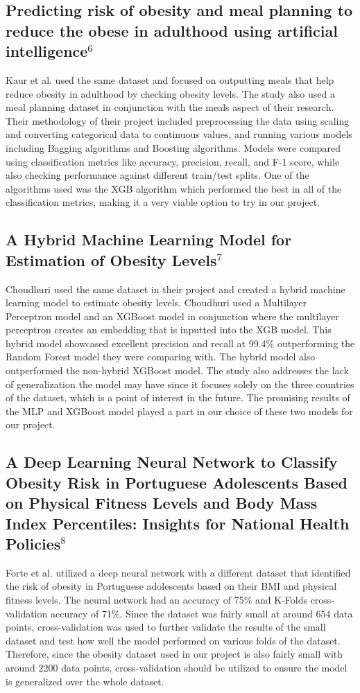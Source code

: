 \documentclass[11pt]{article}
\begin{document}
\subsection{Predicting risk of obesity and meal planning to reduce the obese in adulthood using artificial intelligence$^{6}$}
Kaur et al. used the same dataset and focused on outputting meals that help reduce obesity in adulthood by checking obesity levels. The study also used a meal planning dataset in conjunction with the meals aspect of their research. Their methodology of their project included preprocessing the data using scaling and converting categorical data to continuous values, and running various models including Bagging algorithms and Boosting algorithms. Models were compared using classification metrics like accuracy, precision, recall, and F-1 score, while also checking performance against different train/test splits. One of the algorithms used was the XGB algorithm which performed the best in all of the classification metrics, making it a very viable option to try in our project. 
\subsection{A Hybrid Machine Learning Model for Estimation of Obesity Levels$^{7}$}


Choudhuri used the same dataset in their project and created a hybrid machine learning model to estimate obesity levels. Choudhuri used a Multilayer Perceptron model and an XGBoost model in conjunction where the multilayer perceptron creates an embedding that is inputted into the XGB model. This hybrid model showcased excellent precision and recall at 99.4\% outperforming the Random Forest model they were comparing with. The hybrid model also outperformed the non-hybrid XGBoost model. The study also addresses the lack of generalization the model may have since it focuses solely on the three countries of the dataset, which is a point of interest in the future. The promising results of the MLP and XGBoost model played a part in our choice of these two models for our project.
\subsection{A Deep Learning Neural Network to Classify Obesity Risk in Portuguese Adolescents Based on Physical Fitness Levels and Body Mass Index Percentiles: Insights for National Health Policies$^{8}$}

Forte et al. utilized a deep neural network with a different dataset that identified the risk of obesity in Portuguese adolescents based on their BMI and physical fitness levels. The neural network had an accuracy of 75\% and K-Folds cross-validation accuracy of 71\%. Since the dataset was fairly small at around 654 data points, cross-validation was used to further validate the results of the small dataset and test how well the model performed on various folds of the dataset. Therefore, since the obesity dataset used in our project is also fairly small with around 2200 data points, cross-validation should be utilized to ensure the model is generalized over the whole dataset.
\end{document}
